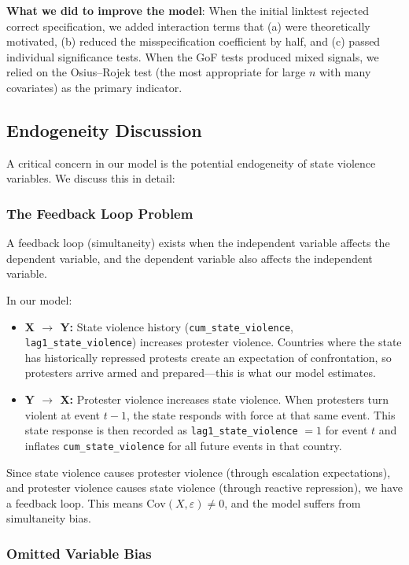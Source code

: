 \documentclass[12pt,a4paper]{article}
\begin{document}
\textbf{What we did to improve the model}: When the initial linktest rejected correct specification, we added interaction terms that (a) were theoretically motivated, (b) reduced the misspecification coefficient by half, and (c) passed individual significance tests. When the GoF tests produced mixed signals, we relied on the Osius--Rojek test (the most appropriate for large $n$ with many covariates) as the primary indicator.

\subsection{Endogeneity Discussion}
\label{sec:endogeneity}

A critical concern in our model is the potential endogeneity of state violence variables. We discuss this in detail:

\subsubsection{The Feedback Loop Problem}

A feedback loop (simultaneity) exists when the independent variable affects the dependent variable, and the dependent variable also affects the independent variable.

In our model:
\begin{itemize}
  \item \textbf{X $\to$ Y:} State violence history (\texttt{cum\_state\_violence}, \texttt{lag1\_state\_violence}) increases protester violence. Countries where the state has historically repressed protests create an expectation of confrontation, so protesters arrive armed and prepared---this is what our model estimates.
  \item \textbf{Y $\to$ X:} Protester violence increases state violence. When protesters turn violent at event $t-1$, the state responds with force at that same event. This state response is then recorded as \texttt{lag1\_state\_violence} $= 1$ for event $t$ and inflates \texttt{cum\_state\_violence} for all future events in that country.
\end{itemize}

Since state violence causes protester violence (through escalation expectations), and protester violence causes state violence (through reactive repression), we have a feedback loop. This means $\text{Cov}(X, \varepsilon) \neq 0$, and the model suffers from simultaneity bias.

\subsubsection{Omitted Variable Bias}
\end{document}
